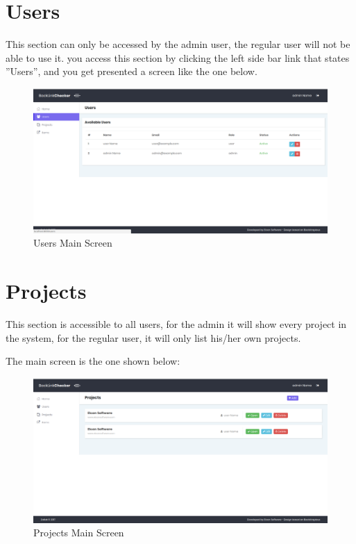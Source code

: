 \section{Users}
This section can only be accessed by the admin user, the regular user will not be able to use it. you access this section by clicking the left side bar link that states ''Users'', and you get presented a screen like the one below.
\begin{figure}[H]
	\caption{Users Main Screen}
	\label{img:usrmain}
	\includegraphics[width=\textwidth]{images/users_screenshot}
\end{figure}

\section{Projects}
This section is accessible to all users, for the admin it will show every project in the system, for the regular user, it will only list his/her own projects.

The main screen is the one shown below:
\begin{figure}[H]
	\caption{Projects Main Screen}
	\label{img:prjmain}
	\includegraphics[width=\textwidth]{images/projects_screenshot}
\end{figure}

